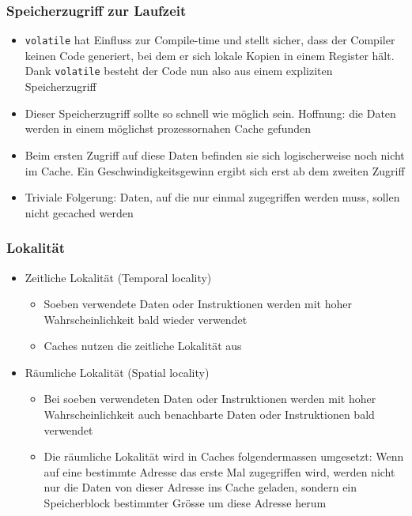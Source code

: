 \subsubsection{Speicherzugriff zur Laufzeit}
\begin{itemize}
	\item \lstinline{volatile} hat Einfluss zur Compile-time und stellt sicher, dass der Compiler keinen Code generiert, bei dem er sich lokale Kopien in einem Register hält. Dank \lstinline{volatile} besteht der Code nun also aus einem expliziten Speicherzugriff  
	\item Dieser Speicherzugriff sollte so schnell wie möglich sein. Hoffnung: die Daten werden in einem möglichst prozessornahen Cache gefunden  
	\item Beim ersten Zugriff auf diese Daten befinden sie sich logischerweise noch nicht im Cache. Ein Geschwindigkeitsgewinn ergibt sich erst ab dem zweiten Zugriff
	\item Triviale Folgerung: Daten, auf die nur einmal zugegriffen werden muss, sollen nicht gecached werden
\end{itemize}

\subsubsection{Lokalität}
\begin{minipage}[t]{6cm}
	\begin{itemize}
		\item Zeitliche Lokalität (Temporal locality) 
		\begin{itemize}
			\item Soeben verwendete Daten oder Instruktionen werden mit hoher Wahrscheinlichkeit bald wieder verwendet 
			\item Caches nutzen die zeitliche Lokalität aus
		\end{itemize}
	\end{itemize}
\end{minipage}
\begin{minipage}[t]{13cm}
	\begin{itemize}
		\item Räumliche Lokalität (Spatial locality) 
		\begin{itemize}
			\item Bei soeben verwendeten Daten oder Instruktionen werden mit hoher Wahrscheinlichkeit auch benachbarte Daten oder Instruktionen bald verwendet 
			\item Die räumliche Lokalität wird in Caches folgendermassen umgesetzt: Wenn auf eine bestimmte Adresse das erste Mal zugegriffen wird, werden nicht nur die Daten von dieser Adresse ins Cache geladen, sondern ein Speicherblock bestimmter Grösse um diese Adresse herum
		\end{itemize}
	\end{itemize}
\end{minipage}

